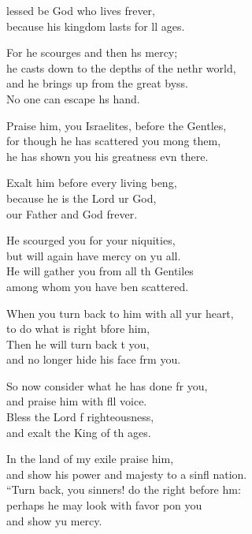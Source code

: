 \begin{psalmverse}
  \begin{patverse}
    lessed be God who lives frever,\Med\\
    because his kingdom lasts for ll ages.

    For he scourges and then hs mercy;\Med\\
    he casts down to the depths of the nethr world,\\
    and he brings up from the great byss.\Med\\
    No one can escape h\pointup{\i}s hand.

    Praise him, you Israelites, before the Gent\pointup{\i}les,\Flex\\
    for though he has scattered you mong them,\Med\\
    he has shown you his greatness evn there.

    Exalt him before every living be\pointup{\i}ng,\Flex\\
    because he is the Lord ur God,\Med\\
    our Father and God frever.

    He scourged you for your \pointup{\i}niquities,\Med\\
    but will again have mercy on yu all.\\
    He will gather you from all th Gentiles\Med\\
    among whom you have ben scattered.

    When you turn back to him with all yur heart,\Med\\
    to do what is right bfore him,\\
    Then he will turn back t you,\Med\\
    and no longer hide his face frm you.

    So now consider what he has done fr you,\Med\\
    and praise him with fll voice.\\
    Bless the Lord f righteousness,\Med\\
    and exalt the King of th ages.

    In the land of my exile  praise him,\Med\\
    and show his power and majesty to a sinfl nation.\\
    “Turn back, you sinners! do the right before h\pointup{\i}m:\Flex\\
    perhaps he may look with favor pon you\Med\\
    and show yu mercy.


\end{patverse}
\end{psalmverse}

